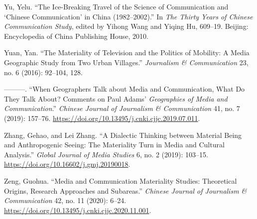 \documentclass{tufte-handout}
\begin{document}
\begin{hangparas}{.25in}{1}
Yu, Yelu. ``The Ice-Breaking Travel of the Science of Communication and
`Chinese Communication' in China (1982--2002).'' In \emph{The Thirty
Years of Chinese Communication Study}, edited by Yihong Wang and Yiqing
Hu, 609--19. Beijing: Encyclopedia of China Publishing House, 2010.

Yuan, Yan. ``The Materiality of Television and the Politics of Mobility:
A Media Geographic Study from Two Urban Villages.'' \emph{Journalism \&
Communication} 23, no. 6 (2016): 92--104, 128.

---------. ``When Geographers Talk about Media and Communication, What
Do They Talk About? Comments on Paul Adams' \emph{Geographies of Media
and Communication}.'' \emph{Chinese Journal of Journalism \&
Communication} 41, no. 7 (2019): 157--76.
\url{https://doi.org/10.13495/j.cnki.cjjc.2019.07.011}.

Zhang, Gehao, and Lei Zhang. ``A Dialectic Thinking between Material
Being and Anthropogenic Seeing: The Materiality Turn in Media and
Cultural Analysis.'' \emph{Global Journal of Media Studies} 6, no. 2
(2019): 103--15. \url{https://doi.org/10.16602/j.gmj.20190018}.

Zeng, Guohua. ``Media and Communication Materiality Studies: Theoretical
Origins, Research Approaches and Subareas.'' \emph{Chinese Journal of
Journalism \& Communication} 42, no. 11 (2020): 6--24.
\url{https://doi.org/10.13495/j.cnki.cjjc.2020.11.001}.



\end{hangparas}
\end{document}

